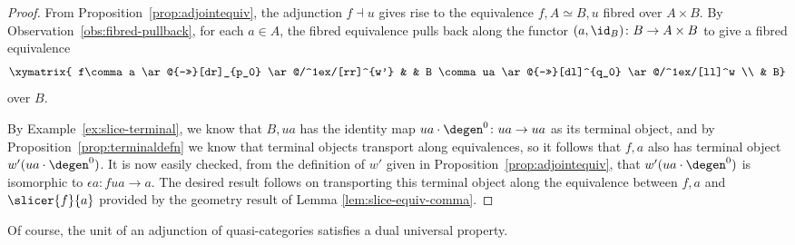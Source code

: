\begin{proof}
    From Proposition~\ref{prop:adjointequiv}, the adjunction $f\dashv u$ gives rise to the equivalence $f \comma A \simeq B \comma u$ fibred over $A \times B$. By Observation~\ref{obs:fibred-pullback}, for each  $a\in A$, the fibred equivalence pulls back along the functor $(a,\id_B)\colon B\to A\times B$ to give a fibred equivalence
    \begin{equation}
      \xymatrix{ f\comma a \ar@{->>}[dr]_{p_0} \ar@/^1ex/[rr]^{w'} & & B \comma ua \ar@{->>}[dl]^{q_0} \ar@/^1ex/[ll]^w \\ & B}
    \end{equation}
  over $B$. 

By Example~\ref{ex:slice-terminal}, we know that $B\comma ua$ has the identity map $ua\cdot\degen^0\colon ua\to ua$ as its terminal object, and by Proposition~\ref{prop:terminaldefn} we know that terminal objects transport along equivalences, so it follows that $f\comma a$ also has terminal object $w'(ua\cdot\degen^0)$. It is now easily checked, from the definition of $w'$ given in Proposition~\ref{prop:adjointequiv}, that $w'(ua\cdot\degen^0)$ is isomorphic to $\epsilon a\colon fua\to a$. The desired result follows on transporting this terminal object along the equivalence between $f\comma a$ and $\slicer{f}{a}$ provided by the geometry result of Lemma \ref{lem:slice-equiv-comma}.
\end{proof}

Of course, the unit of an adjunction of quasi-categories satisfies a dual universal property.

